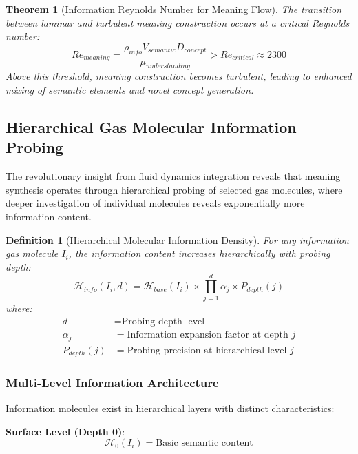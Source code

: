 \documentclass[12pt,a4paper]{article}
\newtheorem{theorem}{Theorem}
\newtheorem{definition}{Definition}
\begin{document}
\begin{theorem}[Information Reynolds Number for Meaning Flow]
The transition between laminar and turbulent meaning construction occurs at a critical Reynolds number:
\begin{equation}
Re_{meaning} = \frac{\rho_{info} V_{semantic} D_{concept}}{\mu_{understanding}} > Re_{critical} \approx 2300
\end{equation}
Above this threshold, meaning construction becomes turbulent, leading to enhanced mixing of semantic elements and novel concept generation.
\end{theorem}

\subsection{Hierarchical Gas Molecular Information Probing}

The revolutionary insight from fluid dynamics integration reveals that meaning synthesis operates through hierarchical probing of selected gas molecules, where deeper investigation of individual molecules reveals exponentially more information content.

\begin{definition}[Hierarchical Molecular Information Density]
For any information gas molecule $I_i$, the information content increases hierarchically with probing depth:
\begin{equation}
\mathcal{H}_{info}(I_i, d) = \mathcal{H}_{base}(I_i) \times \prod_{j=1}^{d} \alpha_j \times P_{depth}(j)
\end{equation}
where:
\begin{align}
d &= \text{Probing depth level} \\
\alpha_j &= \text{Information expansion factor at depth } j \\
P_{depth}(j) &= \text{Probing precision at hierarchical level } j
\end{align}
\end{definition}

\subsubsection{Multi-Level Information Architecture}

Information molecules exist in hierarchical layers with distinct characteristics:

\textbf{Surface Level (Depth 0)}:
\begin{equation}
\mathcal{H}_0(I_i) = \text{Basic semantic content}
\end{equation}
\end{document}
